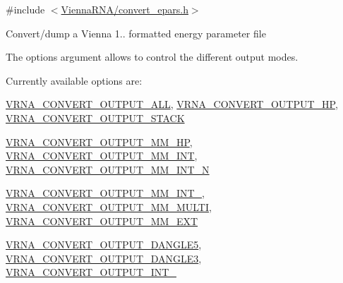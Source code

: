 {\ttfamily \#include $<$\hyperlink{convert__epars_8h}{Vienna\-R\-N\-A/convert\-\_\-epars.\-h}$>$}

Convert/dump a Vienna 1.. formatted energy parameter file

The options argument allows to control the different output modes.\par
Currently available options are\-:\par
\hyperlink{group__energy__parameters__convert_ga8dc6aee5a806c49b71557152f9616bc4}{V\-R\-N\-A\-\_\-\-C\-O\-N\-V\-E\-R\-T\-\_\-\-O\-U\-T\-P\-U\-T\-\_\-\-A\-L\-L}, \hyperlink{group__energy__parameters__convert_gaf66fe2cb11dfcfd32d791049c254a8a4}{V\-R\-N\-A\-\_\-\-C\-O\-N\-V\-E\-R\-T\-\_\-\-O\-U\-T\-P\-U\-T\-\_\-\-H\-P}, \hyperlink{group__energy__parameters__convert_gad23522d63f8d4c50d5a5deee9bee3ef2}{V\-R\-N\-A\-\_\-\-C\-O\-N\-V\-E\-R\-T\-\_\-\-O\-U\-T\-P\-U\-T\-\_\-\-S\-T\-A\-C\-K}\par
\hyperlink{group__energy__parameters__convert_gaa892c7b4957459090f3e08da298cc347}{V\-R\-N\-A\-\_\-\-C\-O\-N\-V\-E\-R\-T\-\_\-\-O\-U\-T\-P\-U\-T\-\_\-\-M\-M\-\_\-\-H\-P}, \hyperlink{group__energy__parameters__convert_ga4ff223fb1f9c62cd92d9ab811ad03d55}{V\-R\-N\-A\-\_\-\-C\-O\-N\-V\-E\-R\-T\-\_\-\-O\-U\-T\-P\-U\-T\-\_\-\-M\-M\-\_\-\-I\-N\-T}, \hyperlink{group__energy__parameters__convert_gaf5d3743219f83c6348155cd81e755bbb}{V\-R\-N\-A\-\_\-\-C\-O\-N\-V\-E\-R\-T\-\_\-\-O\-U\-T\-P\-U\-T\-\_\-\-M\-M\-\_\-\-I\-N\-T\-\_\-N}\par
\hyperlink{group__energy__parameters__convert_ga78382ec622ba99e0ac2262317bdd7316}{V\-R\-N\-A\-\_\-\-C\-O\-N\-V\-E\-R\-T\-\_\-\-O\-U\-T\-P\-U\-T\-\_\-\-M\-M\-\_\-\-I\-N\-T\-\_}, \hyperlink{group__energy__parameters__convert_gae67af9f1cdf7baf2865481282a5d1034}{V\-R\-N\-A\-\_\-\-C\-O\-N\-V\-E\-R\-T\-\_\-\-O\-U\-T\-P\-U\-T\-\_\-\-M\-M\-\_\-\-M\-U\-L\-T\-I}, \hyperlink{group__energy__parameters__convert_gaf14ead7ef1fdbe725ade653750fc51e3}{V\-R\-N\-A\-\_\-\-C\-O\-N\-V\-E\-R\-T\-\_\-\-O\-U\-T\-P\-U\-T\-\_\-\-M\-M\-\_\-\-E\-X\-T}\par
\hyperlink{group__energy__parameters__convert_ga036ffd996d8c8a9acf631760dd1da24b}{V\-R\-N\-A\-\_\-\-C\-O\-N\-V\-E\-R\-T\-\_\-\-O\-U\-T\-P\-U\-T\-\_\-\-D\-A\-N\-G\-L\-E5}, \hyperlink{group__energy__parameters__convert_ga34a8a5479ef885834ef32f3fb43d79bc}{V\-R\-N\-A\-\_\-\-C\-O\-N\-V\-E\-R\-T\-\_\-\-O\-U\-T\-P\-U\-T\-\_\-\-D\-A\-N\-G\-L\-E3}, \hyperlink{group__energy__parameters__convert_ga079aafefd5f8ab57ee5120099a34bd25}{V\-R\-N\-A\-\_\-\-C\-O\-N\-V\-E\-R\-T\-\_\-\-O\-U\-T\-P\-U\-T\-\_\-\-I\-N\-T\-\_}\par
